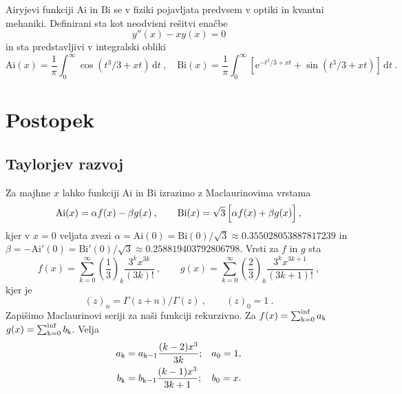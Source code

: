 \documentclass[12pt]{article}
\newcommand{\Ai}{\mathrm{Ai}}
\newcommand{\Bi}{\mathrm{Bi}}
\newcommand{\dd}{\,\mathrm{d}}
\begin{document}

\addtocounter{page}{1}

\newpage
Airyjevi funkciji $\Ai$ in $\Bi$
se v fiziki pojavljata predvsem v optiki in kvantni mehaniki.  Definirani sta kot neodvisni rešitvi enačbe
%
\begin{equation*}
    y''(x) -xy(x) = 0
\end{equation*}
%
in sta predstavljivi v integralski obliki
%
\begin{equation*}
    \Ai(x) = \frac{1}{\pi} \int_0^\infty \cos (t^3/3 + x t) \dd t \>,\quad
    \Bi(x) = \frac{1}{\pi} \int_0^\infty \left[ \mathrm{e}^{-t^3/3 + x t}
        + \sin (t^3/3 + x t) \right] \dd t \>.
\end{equation*}
%

\section{Postopek}
\subsection{Taylorjev razvoj}

Za majhne $x$ lahko funkciji $\Ai$ in $\Bi$ izrazimo
z Maclaurinovima vrstama
%
\begin{equation*}
    \Ai(x) = \alpha f(x) - \beta g(x)\>,\qquad
    \Bi(x) = \sqrt{3}\, \Bigl[\alpha f (x) + \beta g(x) \Bigr]\>,
\end{equation*}
kjer v $x=0$ veljata zvezi
%
$\alpha = \Ai(0) = \Bi(0)/\sqrt{3}\approx 0.355028053887817239$ in
$\beta = -\Ai'(0) = \Bi'(0)/\sqrt{3}\approx 0.258819403792806798$.
Vrsti za $f$ in $g$ sta
\begin{equation*}
    f(x) = \sum_{k=0}^\infty
    \left(\frac{1}{3}\right)_k \frac{3^k x^{3k}}{(3k)!} \>, \qquad
    g(x) = \sum_{k=0}^\infty
    \left(\frac{2}{3}\right)_k \frac{3^k x^{3k+1}}{(3k+1)!} \>,
\end{equation*}
kjer je
\begin{equation*}
    (z)_n = \Gamma(z+n)/\Gamma(z) \>, \qquad (z)_0 = 1 \>.
\end{equation*}
Zapišimo Maclaurinovi seriji za naši funkciji rekurzivno. Za $f(x) = \sum_{\rm k=0}^{\inf} a_{\rm k}$ $g(x) = \sum_{\rm k=0}^{\inf} b_{\rm k}$. Velja
\begin{align}
    a_{\rm k} & = a_{\rm k-1} \frac{(k-2) x^3}{3k};   & a_0   = 1, \\
    b_{\rm k} & = b_{\rm k-1} \frac{(k-1) x^3}{3k+1}; & b_0 = x.
\end{align}
\end{document}
